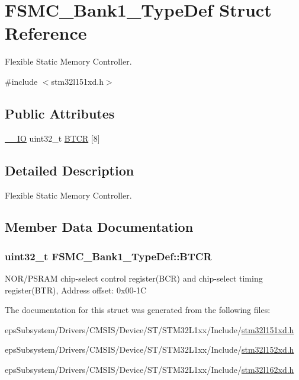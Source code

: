 \hypertarget{struct_f_s_m_c___bank1___type_def}{\section{F\-S\-M\-C\-\_\-\-Bank1\-\_\-\-Type\-Def Struct Reference}
\label{struct_f_s_m_c___bank1___type_def}
}


Flexible Static Memory Controller.  




{\ttfamily \#include $<$stm32l151xd.\-h$>$}

\subsection*{Public Attributes}
\begin{DoxyCompactItemize}
\item 
\hyperlink{core__sc300_8h_aec43007d9998a0a0e01faede4133d6be}{\-\_\-\-\_\-\-I\-O} uint32\-\_\-t \hyperlink{struct_f_s_m_c___bank1___type_def_a3360341d4c7db502fea208cfb48638a3}{B\-T\-C\-R} \mbox{[}8\mbox{]}
\end{DoxyCompactItemize}


\subsection{Detailed Description}
Flexible Static Memory Controller. 

\subsection{Member Data Documentation}
\hypertarget{struct_f_s_m_c___bank1___type_def_a3360341d4c7db502fea208cfb48638a3}{
\subsubsection[{B\-T\-C\-R}]{ uint32\-\_\-t F\-S\-M\-C\-\_\-\-Bank1\-\_\-\-Type\-Def\-::\-B\-T\-C\-R}}\label{struct_f_s_m_c___bank1___type_def_a3360341d4c7db502fea208cfb48638a3}
N\-O\-R/\-P\-S\-R\-A\-M chip-\/select control register(\-B\-C\-R) and chip-\/select timing register(\-B\-T\-R), Address offset\-: 0x00-\/1\-C 

The documentation for this struct was generated from the following files\-:\begin{DoxyCompactItemize}
\item 
eps\-Subsystem/\-Drivers/\-C\-M\-S\-I\-S/\-Device/\-S\-T/\-S\-T\-M32\-L1xx/\-Include/\hyperlink{stm32l151xd_8h}{stm32l151xd.\-h}\item 
eps\-Subsystem/\-Drivers/\-C\-M\-S\-I\-S/\-Device/\-S\-T/\-S\-T\-M32\-L1xx/\-Include/\hyperlink{stm32l152xd_8h}{stm32l152xd.\-h}\item 
eps\-Subsystem/\-Drivers/\-C\-M\-S\-I\-S/\-Device/\-S\-T/\-S\-T\-M32\-L1xx/\-Include/\hyperlink{stm32l162xd_8h}{stm32l162xd.\-h}\end{DoxyCompactItemize}
